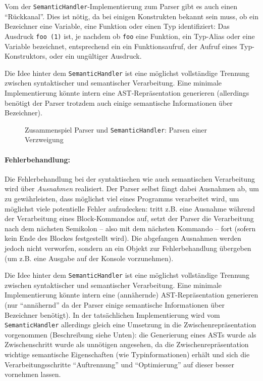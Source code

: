 \documentclass[twoside,a4paper,fleqn,12pt]{article}
\begin{document}

Vom der \verb+SemanticHandler+-Implementierung zum Parser gibt es auch einen "`Rückkanal"'. Dies ist nötig, da bei einigen
Konstrukten bekannt sein muss, ob ein Bezeichner eine Variable, eine Funktion oder einen Typ identifiziert:
Das Ausdruck \verb+foo (1)+ ist, je nachdem ob \verb+foo+ eine Funktion, ein Typ-Alias oder eine Variable bezeichnet,
entsprechend ein ein Funktionsaufruf, der Aufruf eines Typ-Konstruktors, oder ein ungültiger Ausdruck.

Die Idee hinter dem \verb+SemanticHandler+ ist eine möglichst vollständige Trennung zwischen syntaktischer
und semantischer Verarbeitung. Eine minimale Implementierung könnte intern eine
AST-Repräsentation generieren (allerdings benötigt der Parser trotzdem auch einige semantische Informationen über
Bezeichner).

\begin{figure}[h]
   \centering
  
  \caption{Zusammenspiel Parser und \texttt{SemanticHandler}: Parsen einer Verzweigung}
  \label{fig:ParseIf}
\end{figure}

\paragraph{Fehlerbehandlung:}
Die Fehlerbehandlung bei der syntaktischen wie auch semantischen Verarbeitung wird über \emph{Ausnahmen}
realisiert. Der Parser selbst fängt dabei Ausnahmen ab, um zu gewährleisten, dass möglichst viel eines
Programms verarbeitet wird, um möglichst viele potentielle Fehler aufzudecken: %
tritt z.B. eine Ausnahme während der Verarbeitung eines Block-Kommandos auf, setzt der Parser die
Verarbeitung nach dem nächsten Semikolon -- also mit dem nächsten Kommando -- fort (sofern kein Ende
des Blockes festgestellt wird).
Die abgefangen Ausnahmen werden jedoch nicht verworfen, sondern an ein Objekt zur Fehlerbehandlung
übergeben (um z.B. eine Ausgabe auf der Konsole vorzunehmen).

Die Idee hinter dem \verb+SemanticHandler+ ist eine möglichst vollständige Trennung zwischen syntaktischer
und semantischer Verarbeitung. Eine minimale Implementierung könnte intern eine (annähernde)
AST-Repräsentation generieren (nur "`annähernd"' da der Parser einige semantische Informationen über
Bezeichner benötigt). In der tatsächlichen Implementierung wird vom \verb+SemanticHandler+ allerdings 
gleich eine Umsetzung in die Zwischenrepräsentation vorgenommen (Beschreibung siehe Unten):
die Generierung eines ASTs wurde als Zwischenschritt wurde als unnötigen angesehen, da die Zwischenrepräsentation
wichtige semantische Eigenschaften (wie Typinformationen) erhält und sich die Verarbeitungsschritte "`Auftrennung"'
und "`Optimierung"' auf dieser besser vornehmen lassen.
\end{document}
